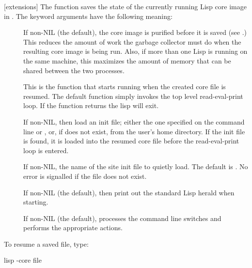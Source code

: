 [extensions]{
       }
The  function saves the state of the currently running Lisp
core image in .  The keyword arguments have the following meaning:
\begin{description}

\item[]
If non-NIL (the default), the core image is purified before it is
saved (see .)  This reduces the amount of work the garbage
collector must do when the resulting core image is being run.  Also, if
more than one Lisp is running on the same machine, this maximizes the
amount of memory that can be shared between the two processes.

\item[]

\item[]
This is the function that starts running when the created core file is
resumed.  The default function simply invokes the top level
read-eval-print loop.  If the function returns the lisp will exit.

\item[]
If non-NIL, then load an init file; either the one
specified on the command line or , or, if
 does not exist,  from the user's
home directory.  If the init file is found, it is loaded into the resumed core
file before the read-eval-print loop is entered.

\item[]
If non-NIL, the name of the site init file to quietly load.  The default is
.  No error is signalled if the file does not exist.

\item[]
If non-NIL (the default), then print out the standard Lisp herald when
starting.

\item[]
If non-NIL (the default), processes the command line switches
and performs the appropriate actions.
\end{description}
\enddefun

To resume a saved file, type:
\begin{example}
lisp -core file
\end{example}

